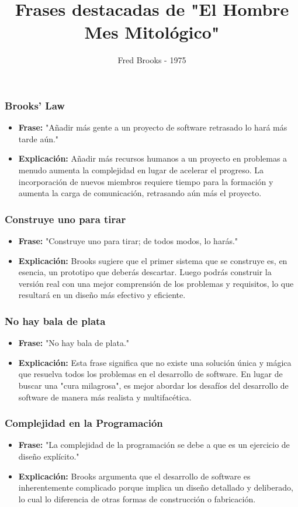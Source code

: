 \documentclass{beamer}
\title{Frases destacadas de "El Hombre Mes Mitológico"}
\author{ Fred Brooks - 1975}
\begin{document}
\begin{frame}
	\titlepage
\end{frame}

\begin{frame}
	\frametitle{Brooks' Law}
	\begin{itemize}
		\item \textbf{Frase:} "Añadir más gente a un proyecto de software retrasado lo hará más tarde aún."
		\item \textbf{Explicación:} Añadir más recursos humanos a un proyecto en problemas a menudo aumenta la complejidad en lugar de acelerar el progreso. La incorporación de nuevos miembros requiere tiempo para la formación y aumenta la carga de comunicación, retrasando aún más el proyecto.
	\end{itemize}
\end{frame}

\begin{frame}
	\frametitle{Construye uno para tirar}
	\begin{itemize}
		\item \textbf{Frase:} "Construye uno para tirar; de todos modos, lo harás."
		\item \textbf{Explicación:} Brooks sugiere que el primer sistema que se construye es, en esencia, un prototipo que deberás descartar. Luego podrás construir la versión real con una mejor comprensión de los problemas y requisitos, lo que resultará en un diseño más efectivo y eficiente.
	\end{itemize}
\end{frame}

\begin{frame}
	\frametitle{No hay bala de plata}
	\begin{itemize}
		\item \textbf{Frase:} "No hay bala de plata."
		\item \textbf{Explicación:} Esta frase significa que no existe una solución única y mágica que resuelva todos los problemas en el desarrollo de software. En lugar de buscar una "cura milagrosa", es mejor abordar los desafíos del desarrollo de software de manera más realista y multifacética.
	\end{itemize}
\end{frame}

\begin{frame}
	\frametitle{Complejidad en la Programación}
	\begin{itemize}
		\item \textbf{Frase:} "La complejidad de la programación se debe a que es un ejercicio de diseño explícito."
		\item \textbf{Explicación:} Brooks argumenta que el desarrollo de software es inherentemente complicado porque implica un diseño detallado y deliberado, lo cual lo diferencia de otras formas de construcción o fabricación.
	\end{itemize}
\end{frame}
\end{document}

